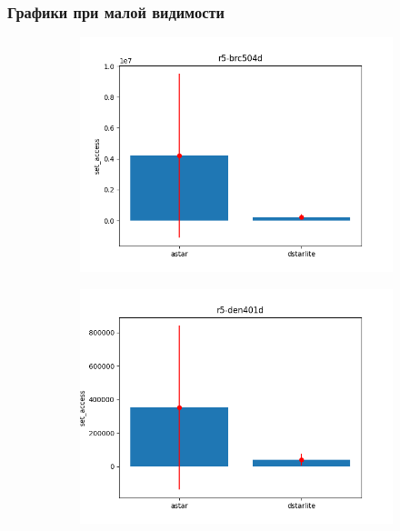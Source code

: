 \documentclass{beamer}
\begin{document}
    \begin{frame}
        \frametitle{Графики при малой видимости}
        \begin{figure}
            \centering
            \begin{subfigure}[b]{0.49\textwidth}
                \centering
                \includegraphics[width=\textwidth]{../figures/astar-to-dstarlite/r5-brc504d}
            \end{subfigure}
            \hfill
            \begin{subfigure}[b]{0.49\textwidth}
                \centering
                \includegraphics[width=\textwidth]{../figures/astar-to-dstarlite/r5-den401d}
            \end{subfigure}

\end{figure}
\end{frame}
\end{document}
